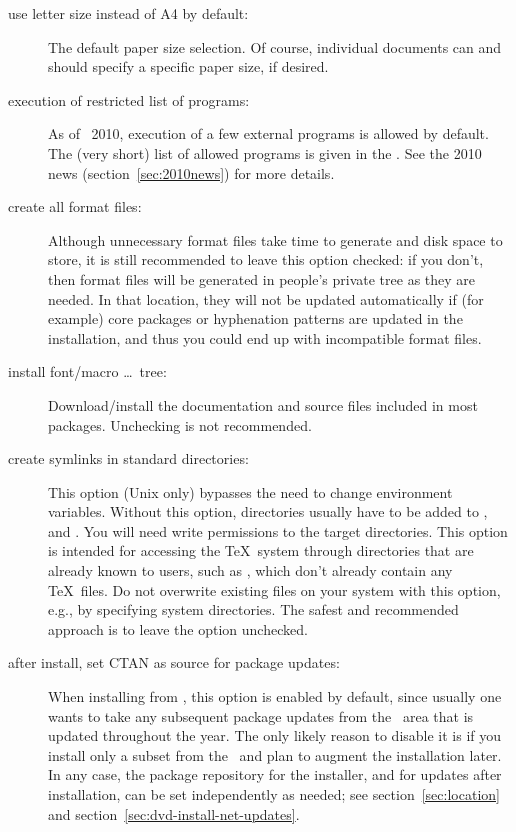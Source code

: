 \documentclass{article}
\begin{document}
\begin{description}
\item[use letter size instead of A4 by default:] The default paper
  size selection.  Of course, individual documents can and should
  specify a specific paper size, if desired.

\item[execution of restricted list of programs:] As of \TL\ 2010,
  execution of a few external programs is allowed by default.  The (very
  short) list of allowed programs is given in the .
  See the 2010 news (section~\ref{sec:2010news}) for more details.

\item[create all format files:] Although unnecessary format files
  take time to generate and disk space to store, it is still recommended
  to leave this option checked: if you don't, then format files will be
  generated in people's private  tree as they are
  needed.  In that location, they will not be updated automatically if
  (for example) core packages or hyphenation patterns are updated in the
  installation, and thus you could end up with incompatible format files.

\item[install font/macro \ldots\ tree:] Download/install the
  documentation and source files included in most packages.  Unchecking
  is not recommended.

\item[create symlinks in standard directories:]
  This option (Unix only) bypasses the need to change environment
  variables. Without this option, \TL{} directories usually have to be
  added to ,  and . You
  will need write permissions to the target directories.  This option is
  intended for accessing the \TeX\ system through directories that are
  already known to users, such as , which don't
  already contain any \TeX\ files.  Do not overwrite existing files on
  your system with this option, e.g., by specifying system directories.
  The safest and recommended approach is to leave the option unchecked.

\item[after install, set CTAN as source for package updates:]
  When installing from \DVD, this
  option is enabled by default, since usually one wants to take any
  subsequent package updates from the \CTAN\ area that is updated
  throughout the year.  The only likely reason to disable it is if you
  install only a subset from the \DVD\ and plan to augment the
  installation later.  In any case, the package repository for the
  installer, and for updates after installation, can be set
  independently as needed; see section~\ref{sec:location} and
  section~\ref{sec:dvd-install-net-updates}.
\end{description}
\end{document}
